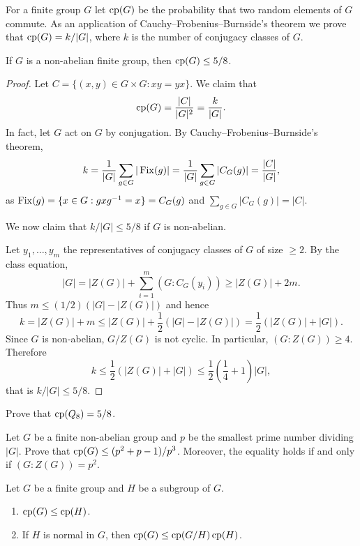 
For a finite group $G$ let $\operatorname{cp}(G)$ be the probability 
that two random elements of $G$ commute. 
As an application of Cauchy--Frobenius--Burnside's theorem we
prove that 
$\operatorname{cp}(G)=k/|G|$, where $k$ is the number of conjugacy classes
of $G$.

\begin{theorem}
    If $G$ is a non-abelian finite group, then $\operatorname{cp}(G)\leq5/8$.
\end{theorem}

\begin{proof}
    Let $C=\{(x,y)\in G\times G:xy=yx\}$. We claim that  
    \[
    \operatorname{cp}(G)=\frac{|C|}{|G|^2}=\frac{k}{|G|}.
    \]
    In fact, let $G$ act on $G$ by conjugation. 
    By Cauchy--Frobenius--Burnside's theorem, 
    \[
    k=\frac{1}{|G|}\sum_{g\in G}|\operatorname{Fix}(g)|=\frac{1}{|G|}\sum_{g\in G}|C_G(g)|=\frac{|C|}{|G|},
    \]
    as $\operatorname{Fix}(g)=\{x\in G:gxg^{-1}=x\}=C_G(g)$ and $\sum_{g\in G}|C_G(g)|=|C|$. 

    We now claim that $k/|G|\leq 5/8$ if $G$ is non-abelian.
    
    Let $y_1,\dots,y_m$ the representatives of conjugacy classes of $G$ 
    of size $\geq2$. By the class equation, 
    \[
    |G|=|Z(G)|+\sum_{i=1}^m(G:C_G(y_i))\geq |Z(G)|+2m.
    \]
    Thus $m\leq(1/2)(|G|-|Z(G)|)$ and hence 
    \[
    k=|Z(G)|+m\leq |Z(G)|+\frac12(|G|-|Z(G)|)=\frac12(|Z(G)|+|G|).
    \]
    Since $G$ is non-abelian, $G/Z(G)$ is not cyclic. In particular, 
    $(G:Z(G))\geq4$. Therefore
    \[
    k\leq\frac12(|Z(G)|+|G|)\leq\frac12\left(\frac14+1\right)|G|,
    \]
    that is $k/|G|\leq 5/8$. 
\end{proof}

\begin{exercise}
    Prove that $\operatorname{cp}(Q_8)=5/8$. 
\end{exercise}

\begin{exercise}
    Let $G$ be a finite non-abelian group and $p$ be the smallest prime number
    dividing $|G|$. Prove that $\operatorname{cp}(G)\leq (p^2+p-1)/p^3$. Moreover, 
    the equality holds if and only if $(G:Z(G))=p^2$. 
\end{exercise}

\begin{exercise}
    Let $G$ be a finite group and $H$ be a subgroup of $G$.
    \begin{enumerate}
        \item $\operatorname{cp}(G)\leq\operatorname{cp}(H)$.
        \item If $H$ is normal in $G$, then $\operatorname{cp}(G)\leq\operatorname{cp}(G/H)\operatorname{cp}(H)$.
    \end{enumerate}
\end{exercise}

